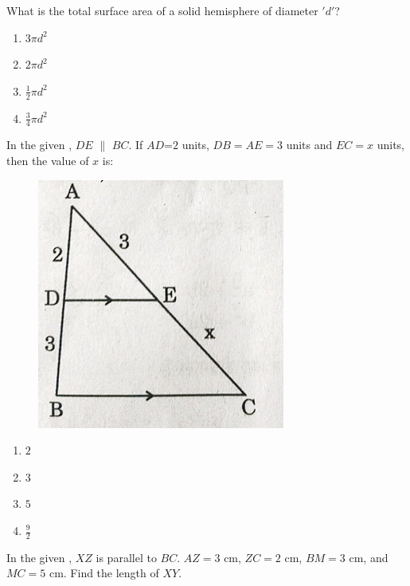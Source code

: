    \item What is the total surface area of a solid hemisphere of diameter $'d'$?
    \begin{enumerate}
       \item $3$$\pi d^2$  \item $2$$\pi d^2$  \item $\frac{1}{2}\pi d^2$
        \item $\frac{3}{4}\pi d^2$
    \end{enumerate}   
\item  In the given , $DE$ $\parallel$ $BC$. If $AD$=$2$ units, $DB=AE=3$ units and $EC=x$ units, then the value of $x$ is:
\begin{figure}[H]
    \centering
    \includegraphics[width=\columnwidth]{figs/fig6.png}
    \caption{}
    \label{fig:figure1}
\end{figure}
\begin{enumerate}
    \item $2$ \item $3$ \item $5$ \item $\frac{9}{2}$
\end{enumerate}
\item In the given , $XZ$ is parallel to $BC$. $AZ = 3$ cm, $ZC = 2$ cm, $BM = 3$ cm, and $MC = 5$ cm. Find the length of $XY$.

